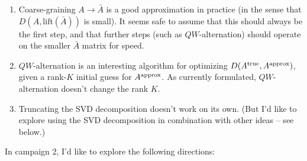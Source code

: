 \documentclass{article}
\numberwithin{equation}{section}   %
\begin{document}
\begin{enumerate}

\item Coarse-graining $A \rightarrow \bar A$ is a good approximation in practice (in the
 sense that $D(A,\mbox{lift}(\bar A))$ is small). It seems safe to assume that this should always be
 the first step, and that further steps (such as $QW$-alternation) should operate on the
 smaller $\bar A$ matrix for speed.

\item $QW$-alternation is an interesting algorithm for optimizing $D(A^{\rm true}, A^{\rm approx})$, 
 given a rank-$K$ initial guess for $A^{\rm approx}$. As currently formulated, $QW$-alternation
 doesn't change the rank $K$.

\item Truncating the SVD decomposition doesn't work on its own. (But I'd like to explore
 using the SVD decomposition in combination with other ideas -- see below.)

\end{enumerate}

\par\noindent
In campaign 2, I'd like to explore the following directions:
\end{document}
